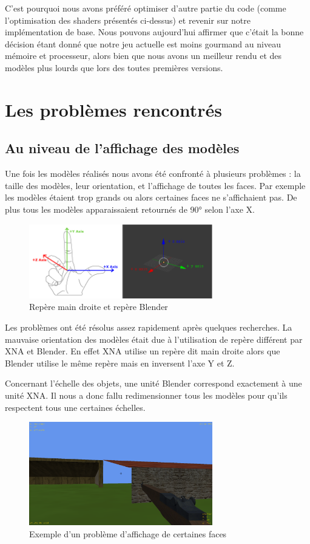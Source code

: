 \documentclass[11pt]{report}
\begin{document}
C'est pourquoi nous avons préféré optimiser d'autre partie du code (comme l'optimisation des shaders présentés ci-dessus) et revenir sur notre implémentation de base. Nous pouvons aujourd'hui affirmer que c'était la bonne décision étant donné que notre jeu actuelle est moins gourmand au niveau mémoire et processeur, alors bien que nous avons un meilleur rendu et des modèles plus lourds que lors des toutes premières versions.

\section{Les problèmes rencontrés}

\subsection{Au niveau de l'affichage des modèles}

Une fois les modèles réalisés nous avons été confronté à plusieurs problèmes : la taille des modèles, leur orientation, et l’affichage de toutes les faces. Par exemple les modèles étaient trop grands ou alors certaines faces ne s'affichaient pas. De plus tous les modèles apparaissaient retournés de \ang{90} selon l'axe X.

\begin{figure}[htbp]
\centering
\includegraphics[width=8cm]{repere.png}
\caption{Repère main droite et repère Blender}
\end{figure}

Les problèmes ont été résolus assez rapidement après quelques recherches. La mauvaise orientation des modèles était due à l'utilisation de repère différent par XNA et Blender. En effet XNA utilise un repère dit main droite alors que Blender utilise le même repère mais en inversent l'axe Y et Z.

Concernant l’échelle des objets, une unité Blender correspond exactement à une unité XNA. Il nous a donc fallu redimensionner tous les modèles pour qu'ils respectent tous une certaines échelles.

\begin{figure}[htbp]
\centering
\includegraphics[width=8cm]{bug-affichage.png}
\caption{Exemple d'un problème d'affichage de certaines faces}
\end{figure}
\end{document}
